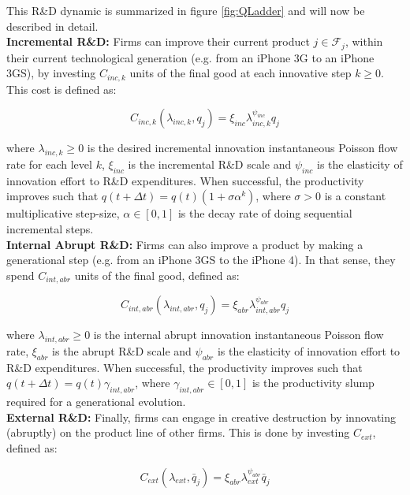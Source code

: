 \documentclass[letterpaper,12pt]{article}
\theoremstyle{definition}
\begin{document}
This R\&D dynamic is summarized in figure \ref{fig:QLadder} and will now be described in detail.\\

\textbf{Incremental R\&D:} Firms can improve their current product $j \in \mathscr{F}_j$, within their current technological generation (e.g. from an iPhone 3G to an iPhone 3GS), by investing $C_{inc,k}$ units of the final good at each innovative step $k \geq 0$. This cost is defined as:

\begin{equation} \label{eq:Cinc}
C_{inc,k}(\lambda_{inc,k},q_j) = \xi_{inc}\lambda_{inc,k}^{\psi_{inc}}q_j
\end{equation}

\noindent where $\lambda_{inc,k} \ge 0$ is the desired incremental innovation instantaneous Poisson flow rate for each level $k$, $\xi_{inc}$ is the incremental R\&D scale and $\psi_{inc}$ is the elasticity of innovation effort to R\&D expenditures. When successful, the productivity improves such that $q(t + \Delta t) = q(t)(1 + \sigma\alpha^{k})$, where $\sigma > 0$ is a constant multiplicative step-size, $\alpha \in [0, 1]$ is the decay rate of doing sequential incremental steps.\\

\textbf{Internal Abrupt R\&D:} Firms can also improve a product by making a generational step (e.g. from an iPhone 3GS to the iPhone 4). In that sense, they spend $C_{int, abr}$ units of the final good, defined as:

\begin{equation} \label{eq:Cintabr}
C_{int,abr}(\lambda_{int,abr},q_j) = \xi_{abr}\lambda_{int,abr}^{\psi_{abr}}q_j
\end{equation}

\noindent where $\lambda_{int,abr} \ge 0$ is the internal abrupt innovation instantaneous Poisson flow rate, $\xi_{abr}$ is the abrupt R\&D scale and $\psi_{abr}$ is the elasticity of innovation effort to R\&D expenditures. When successful, the productivity improves such that $q(t + \Delta t) = q(t)\gamma_{int,abr}$, where $\gamma_{int,abr} \in [0,1]$ is the productivity slump required for a generational evolution.\\

\textbf{External R\&D:} Finally, firms can engage in creative destruction by innovating (abruptly) on the product line of other firms. This is done by investing $C_{ext}$, defined as:

\begin{equation} \label{eq:Cext}
C_{ext}(\lambda_{ext},\bar{q}_j) = \xi_{abr}\lambda_{ext}^{\psi_{abr}}\bar{q}_j
\end{equation}
\end{document}
